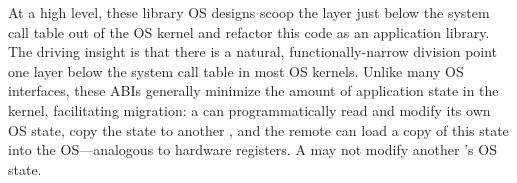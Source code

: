 
At a high level, these library OS designs
scoop the layer just below the system call table out of the OS kernel
and refactor this code as an application library.  
The driving insight is that there is a natural, functionally-narrow division point 
one layer below the system call table
in most OS kernels.
Unlike many OS interfaces, these \pal{} ABIs generally minimize the amount of application state in the kernel, facilitating
migration: a \picoproc{} can programmatically read and modify its own OS state,
copy the state to another \picoproc{}, and the remote \picoproc{} can 
load a copy of this state into the OS---analogous to hardware registers.
A \picoproc{} may not modify another \picoproc{}'s OS state.




